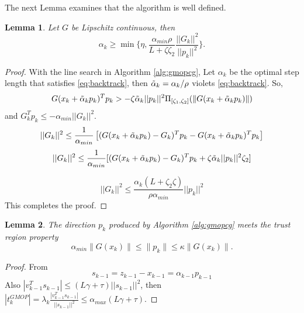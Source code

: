 \documentclass{article}
\newtheorem{lemma}{Lemma}
\theoremstyle{remark}
\begin{document}
{The next Lemma examines that the algorithm is well defined.
\begin{lemma}
\label{lemm2:gmopcgm}
    Let $G$ be Lipschitz continuous, then 
    \[
    \alpha_k\geq \min\{\eta, \frac{\alpha_{min}\rho}{L+\zeta\zeta_2 }\frac{||G_k||^2}{||p_k||^2}\}.
    \]
\end{lemma}
\begin{proof}
    With the line search in  Algorithm \ref{alg:gmopcg}, Let $\alpha_k$ be the optimal step length that satisfies \eqref{eq:backtrack}, then $\Tilde{\alpha}_k = \alpha_k/\rho $ violets \eqref{eq:backtrack}. So, 
\[
G(x_k+\tilde{\alpha}_kp_k)^Tp_k>- \zeta \tilde{\alpha}_k||p_k||^2\Pi_{[\zeta_1, \zeta_2]}(\|G(x_k + \Tilde{\alpha}_k p_k)\|)
\]
and  $G_k^Tp_k\leq -\alpha_{min}||G_k||^2$. 
\[
||G_k||^2\leq \frac{1}{\alpha_{min}}\left[(G(x_k+\Tilde{\alpha}_kp_k)- G_k)^Tp_k-G(x_k+\Tilde{\alpha}_kp_k)^Tp_k\right]
\]
\[
||G_k||^2\leq \frac{1}{\alpha_{min}}[(G(x_k+\Tilde{\alpha}_kp_k)- G_k)^Tp_k+\zeta \tilde{\alpha}_k||p_k||^2\zeta_2]
\]

\[
||G_k||^2\leq \frac{\alpha_k(L+\zeta_2\zeta) }{\rho\alpha_{min}}||p_k||^2
\]
This completes the proof.
\end{proof}

\begin{lemma}
\label{lemm4:gmopcgm}
     The direction $p_k$ produced by  Algorithm \ref{alg:gmopcg} meets the trust region property
    \[
    \alpha_{min} \|G(x_k)\|\leq \|p_k\|\leq \kappa \|G(x_k)\|.
    \]
\end{lemma}
\begin{proof}

From 
\[
s_{k-1}=z_{k-1}-x_{k-1}=\alpha_{k-1}p_{k-1}
\]
Also $|v_{k-1}^Ts_{k-1}|\leq (L\gamma+\tau)||s_{k-1}||^2 $,  then $|t_k^{GMOP}|= \lambda_k \frac{|v_{k-1}^Ts_{k-1}|}{||s_{k-1}||^2}\leq \alpha_{max}(L\gamma+\tau)$.


\end{proof}}
\end{document}
